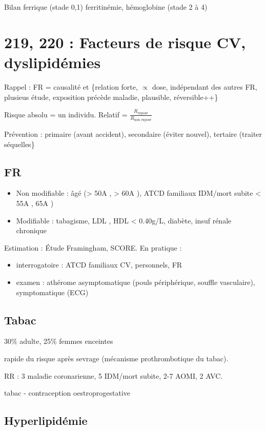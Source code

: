 \documentclass[11pt]{article}
\begin{document}
Bilan ferrique (stade 0,1) ferritinémie, hémoglobine (stade 2 à 4)

\section{219, 220 :  Facteurs de risque CV, dyslipidémies}
\label{sec:orgf3e6ff9}
Rappel : FR = causalité et \{relation forte, \(\propto\) dose, indépendant des autres
FR, plusieus étude, exposition précède maladie, plausible, réversible++\}

Risque absolu = un individu. Relatif = \(\frac{R_{\text{exposé}}}{R_{\text{non exposé}}}\)

Prévention : primaire (avant accident), secondaire (éviter nouvel), tertaire
(traiter séquelles\}

\subsection{FR}
\label{sec:orgf831ea3}
\begin{itemize}
\item Non modifiable : âgé (> 50A \male, > 60A \female), ATCD familiaux IDM/mort
subite < 55A \male, 65A \female)
\item Modifiable : tabagisme, LDL \inc, HDL < 0.40g/L, diabète, insuf rénale
chronique
\end{itemize}

Estimation : Étude Framingham, SCORE. En pratique : 
\begin{itemize}
\item interrogatoire  : ATCD familiaux CV, personnels, FR
\item examen : athérome asymptomatique (pouls périphérique, souffle vasculaire),
symptomatique (ECG)
\end{itemize}

\subsection{Tabac}
\label{sec:org8a14c91}
30\% adulte, 25\% femmes enceintes

\inc rapide du risque après sevrage (mécanisme prothrombotique du tabac). 

RR : 3 maladie coronarienne, 5 IDM/mort subite, 2-7 AOMI, 2 AVC.

\danger tabac - contraception oestroprogestative

\subsection{Hyperlipidémie}
\label{sec:org6e1cc60}
\end{document}
